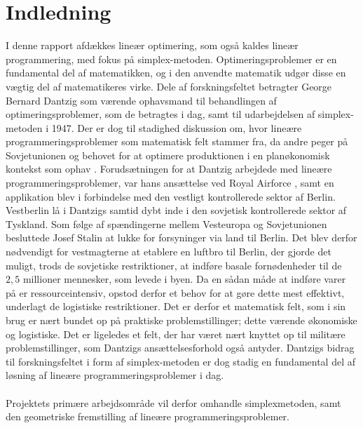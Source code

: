 \chapter{Indledning}
I denne rapport afdækkes lineær optimering, som også kaldes lineær programmering, med fokus på simplex-metoden.
Optimeringsproblemer er en fundamental del af matematikken, og i den anvendte matematik udgør disse en vægtig del af matematikeres virke. 
Dele af forskningsfeltet betragter George Bernard Dantzig som værende  ophavsmand til behandlingen af optimeringsproblemer, som de betragtes i dag, samt til udarbejdelsen af simplex-metoden \citep[side 107]{refa} i 1947.
Der er dog til stadighed diskussion om, hvor lineære programmeringsproblemer som matematisk felt stammer fra, da andre peger på Sovjetunionen og behovet for at optimere produktionen i en planøkonomisk kontekst som ophav \citep[side 155]{refb}.
Forudsætningen for at Dantzig arbejdede med lineære programmeringsproblemer, var hans ansættelse ved Royal Airforce \citep[side 107]{refa}, samt en applikation blev i forbindelse med den vestligt kontrollerede sektor af Berlin.
Vestberlin lå i Dantzigs samtid dybt inde i den sovjetisk kontrollerede sektor af Tyskland. 
Som følge af spændingerne mellem Vesteuropa og Sovjetunionen besluttede Josef Stalin at lukke for forsyninger via land til Berlin.
Det blev derfor nødvendigt for vestmagterne at etablere en luftbro til Berlin, der gjorde det muligt, trods de sovjetiske restriktioner, at indføre basale fornødenheder til de $2,5$ millioner mennesker, som levede i byen.
Da en sådan måde at indføre varer på er ressourceintensiv, opstod derfor et behov for at gøre dette mest effektivt, underlagt de logistiske restriktioner.
Det er derfor et matematisk felt, som i sin brug er nært bundet op på praktiske problemstillinger; dette værende økonomiske og logistiske.
Det er ligeledes et felt, der har været nært knyttet op til militære problemstillinger, som Dantzigs ansættelsesforhold også antyder.
Dantzigs bidrag til forskningsfeltet i form af simplex-metoden er dog stadig en fundamental del af løsning af lineære programmeringsproblemer i dag.
\\\\
Projektets primære arbejdsområde vil derfor omhandle simplexmetoden, samt den geometriske fremstilling af lineære programmeringsproblemer.
